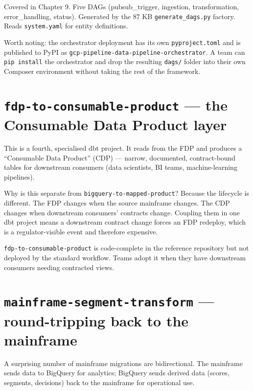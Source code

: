 \documentclass[
  11pt,
  british,
  oneside]{book}
\begin{document}
Covered in Chapter 9. Five DAGs (pubsub\_trigger, ingestion,
transformation, error\_handling, status). Generated by the 87 KB
\texttt{generate\_dags.py} factory. Reads \texttt{system.yaml} for
entity definitions.

Worth noting: the orchestrator deployment has its own
\texttt{pyproject.toml} and is published to PyPI as
\texttt{gcp-pipeline-data-pipeline-orchestrator}. A team can
\texttt{pip\ install} the orchestrator and drop the resulting
\texttt{dags/} folder into their own Composer environment without taking
the rest of the framework.

\hypertarget{fdp-to-consumable-product-the-consumable-data-product-layer}{%
\section{\texorpdfstring{\texttt{fdp-to-consumable-product} --- the
Consumable Data Product
layer}{fdp-to-consumable-product --- the Consumable Data Product layer}}\label{fdp-to-consumable-product-the-consumable-data-product-layer}}

This is a fourth, specialised dbt project. It reads from the FDP and
produces a ``Consumable Data Product'' (CDP) --- narrow, documented,
contract-bound tables for downstream consumers (data scientists, BI
teams, machine-learning pipelines).

Why is this separate from \texttt{bigquery-to-mapped-product}? Because
the lifecycle is different. The FDP changes when the source mainframe
changes. The CDP changes when downstream consumers' contracts change.
Coupling them in one dbt project means a downstream contract change
forces an FDP redeploy, which is a regulator-visible event and therefore
expensive.

\texttt{fdp-to-consumable-product} is code-complete in the reference
repository but not deployed by the standard workflow. Teams adopt it
when they have downstream consumers needing contracted views.

\hypertarget{mainframe-segment-transform-round-tripping-back-to-the-mainframe}{%
\section{\texorpdfstring{\texttt{mainframe-segment-transform} ---
round-tripping back to the
mainframe}{mainframe-segment-transform --- round-tripping back to the mainframe}}\label{mainframe-segment-transform-round-tripping-back-to-the-mainframe}}

A surprising number of mainframe migrations are bidirectional. The
mainframe sends data to BigQuery for analytics; BigQuery sends derived
data (scores, segments, decisions) back to the mainframe for operational
use.
\end{document}
